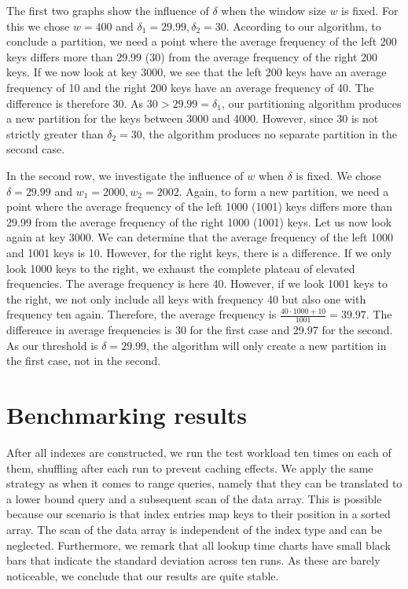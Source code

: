 The first two graphs show the influence of $\delta$ when the window size $w$ is fixed. For this we chose $w = 400$ and $\delta_1 = 29.99, \delta_2 = 30$. According to our algorithm, to conclude a partition, we need a point where the average frequency of the left 200 keys differs more than 29.99 (30) from the average frequency of the right 200 keys. If we now look at key 3000, we see that the left 200 keys have an average frequency of 10 and the right 200 keys have an average frequency of 40. The difference is therefore 30. As $30 > 29.99 = \delta_1$, our partitioning algorithm produces a new partition for the keys between 3000 and 4000. However, since 30 is not strictly greater than $\delta_2 = 30$, the algorithm produces no separate partition in the second case.

In the second row, we investigate the influence of $w$ when $\delta$ is fixed. We chose $\delta = 29.99$ and $w_1 = 2000, w_2 = 2002$. Again, to form a new partition, we need a point where the average frequency of the left 1000 (1001) keys differs more than 29.99 from the average frequency of the right 1000 (1001) keys. Let us now look again at key 3000. We can determine that the average frequency of the left 1000 and 1001 keys is 10. However, for the right keys, there is a difference. If we only look 1000 keys to the right, we exhaust the complete plateau of elevated frequencies. The average frequency is here 40. However, if we look 1001 keys to the right, we not only include all keys with frequency 40 but also one with frequency ten again. Therefore, the average frequency is $\frac{40 \cdot 1000 + 10}{1001} = 39.97$. The difference in average frequencies is 30 for the first case and 29.97 for the second. As our threshold is $\delta = 29.99$, the algorithm will only create a new partition in the first case, not in the second.


\section{Benchmarking results}\label{sec:resperformance}
After all indexes are constructed, we run the test workload ten times on each of them, shuffling after each run to prevent caching effects. We apply the same strategy as \citeauthor{Dittrich2021} when it comes to range queries, namely that they can be translated to a lower bound query and a subsequent scan of the data array. This is possible because our scenario is that index entries map keys to their position in a sorted array. The scan of the data array is independent of the index type and can be neglected. Furthermore, we remark that all lookup time charts have small black bars that indicate the standard deviation across ten runs. As these are barely noticeable, we conclude that our results are quite stable.

